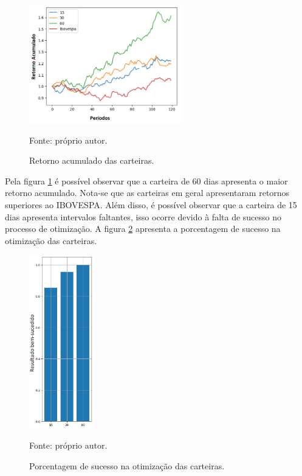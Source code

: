         \begin{figure}[H]
            \centering
            \caption{Retorno acumulado das carteiras.}
            \label{fig:retorno_acumulado}
            \includegraphics[width=0.6\textwidth]{./imagens/retorno_acumulado.png}
            \par \footnotesize Fonte: próprio autor.
        \end{figure}

        \ipar Pela figura \ref{fig:retorno_acumulado} é possível observar que a carteira de 60 dias apresenta o maior retorno acumulado. Nota-se que as carteiras em geral apresentaram retornos superiores ao \acrshort{IBOVESPA}. Além disso, é possível observar que a carteira de 15 dias apresenta intervalos faltantes, isso ocorre devido à falta de sucesso no processo de otimização. A figura \ref{fig:success_results} apresenta a porcentagem de sucesso na otimização das carteiras.

        \begin{figure}[H]
            \centering
            \caption{Porcentagem de sucesso na otimização das carteiras.}
            \label{fig:success_results}
            \includegraphics[width=0.25\textwidth]{./imagens/success_results.png}
            \par \footnotesize Fonte: próprio autor.
        \end{figure}

